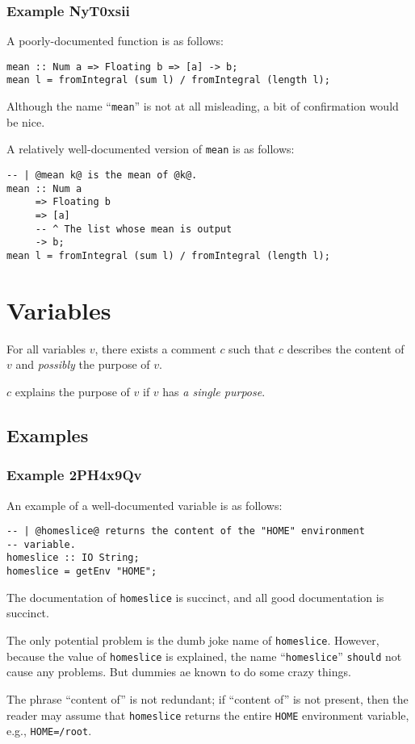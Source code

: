 \documentclass{report}
\begin{document}
\subsubsection{Example NyT0xsii}
A poorly-documented function is as follows:
\begin{lstlisting}
mean :: Num a => Floating b => [a] -> b;
mean l = fromIntegral (sum l) / fromIntegral (length l);
\end{lstlisting}
Although the name ``\texttt{mean}'' is not at all misleading, a bit of confirmation would be nice.

A relatively well-documented version of \texttt{mean} is as follows:
\begin{lstlisting}
-- | @mean k@ is the mean of @k@.
mean :: Num a
     => Floating b
     => [a]
     -- ^ The list whose mean is output
     -> b;
mean l = fromIntegral (sum l) / fromIntegral (length l);
\end{lstlisting}
\section{Variables}
For all variables $v$, there exists a comment $c$ such that $c$ describes the content of $v$ and \textit{possibly} the purpose of $v$.

$c$ explains the purpose of $v$ if $v$ has \textit{a single purpose}.
\subsection{Examples}
\subsubsection{Example 2PH4x9Qv}
An example of a well-documented variable is as follows:
\begin{lstlisting}
-- | @homeslice@ returns the content of the "HOME" environment
-- variable.
homeslice :: IO String;
homeslice = getEnv "HOME";
\end{lstlisting}
The documentation of \texttt{homeslice} is succinct, and all good documentation is succinct.

The only potential problem is the dumb joke name of \texttt{homeslice}.  However, because the value of \texttt{homeslice} is explained, the name ``\texttt{homeslice}'' \texttt{should} not cause any problems.  But dummies ae known to do some crazy things.

The phrase ``content of'' is not redundant; if ``content of'' is not present, then the reader may assume that \texttt{homeslice} returns the entire \texttt{HOME} environment variable, e.g., \texttt{HOME=/root}.
\end{document}
